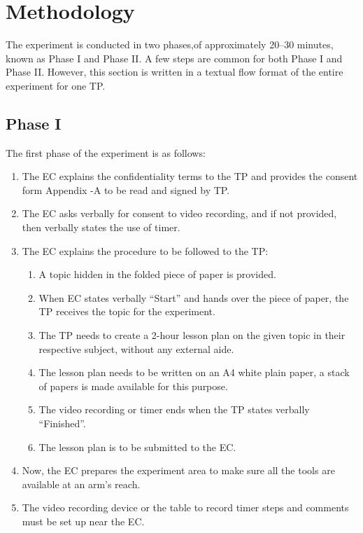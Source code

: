 \section{Methodology}

The experiment is conducted in two phases,of approximately 20–30 minutes, known as Phase I and Phase II. A few steps are common for both Phase I and Phase II. However, this section is written in a textual flow format of the entire experiment for one TP. 

\subsection{Phase I}

The first phase of the experiment is as follows:

\begin{enumerate}
    \item The EC explains the confidentiality terms to the TP and provides the consent form Appendix -A to be read and signed by TP.
    \item The EC asks verbally for consent to video recording, and if not provided, then verbally states the use of timer.
    \item The EC explains the procedure to be followed to the TP:
    \begin{enumerate}
        \item A topic hidden in the folded piece of paper is provided.
        \item When EC states verbally “Start” and hands over the piece of paper, the TP receives the topic for the experiment.
        \item The TP needs to create a 2-hour lesson plan on the given topic in their respective subject, without any external aide.
        \item The lesson plan needs to be written on an A4 white plain paper, a stack of papers is made available for this purpose.
        \item The video recording or timer ends when the TP states verbally “Finished”.
        \item The lesson plan is to be submitted to the EC.
    \end{enumerate}
    \item Now, the EC prepares the experiment area to make sure all the tools are available at an arm’s reach.
    \item The video recording device or the table to record timer steps and comments must be set up near the EC.

\end{enumerate}
